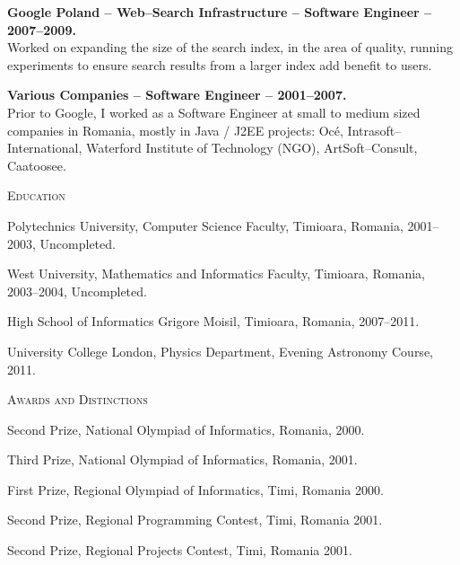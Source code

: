 \documentclass[10pt]{article}
\begin{document}
\begin{list}{}{\leftmargin=0em}
\item
{\bf Google Poland -- Web--Search Infrastructure -- Software Engineer -- 2007--2009.}\\
Worked on expanding the size of the search index, in the area of quality, running experiments to ensure
search results from a larger index add benefit to users.

\item
{\bf Various Companies -- Software Engineer -- 2001--2007.}\\
Prior to Google, I worked as a Software Engineer at small to medium sized companies in Romania, mostly in Java / J2EE projects:
Oc\'e, Intrasoft--International, Waterford Institute of Technology (NGO), ArtSoft--Consult, Caatoosee.

\end{list}


\vspace{0.16in}

\noindent
\textcolor{Primary}{{\large \textsc{Education}}}
\begin{list}{}{\leftmargin=0em}
  \setlength{\itemsep}{1pt}
  \setlength{\parskip}{0pt}
  \setlength{\parsep}{0pt}
  \item Polytechnics University, Computer Science Faculty, Timioara, Romania, 2001--2003, Uncompleted.
  \item West University, Mathematics and Informatics Faculty, Timioara, Romania, 2003--2004, Uncompleted.
  \item High School of Informatics Grigore Moisil, Timioara, Romania, 2007--2011.
  \item University College London, Physics Department, Evening Astronomy Course, 2011.
\end{list}

\vspace{0.16in}

\noindent
\textcolor{Primary}{{\large \textsc{Awards and Distinctions}}}
\begin{list}{}{\leftmargin=0em}
  \setlength{\itemsep}{1pt}
  \setlength{\parskip}{0pt}
  \setlength{\parsep}{0pt}
  \item{Second Prize, National Olympiad of Informatics, Romania, 2000.}
  \item{Third Prize, National Olympiad of Informatics, Romania, 2001.}
  \item{First Prize, Regional Olympiad of Informatics, Timi, Romania 2000.}
  \item{Second Prize, Regional Programming Contest, Timi, Romania 2001.}
  \item{Second Prize, Regional Projects Contest, Timi, Romania 2001.}
\end{list}
\end{document}
